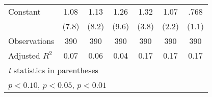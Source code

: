 \begin{table}[htbp]
\begin{tabular}{l*{6}{c}}
Constant        &     1.08\sym{***}&     1.13\sym{***}&     1.26\sym{***}&     1.32\sym{***}&     1.07\sym{**} &     .768         \\
                &    (7.8)         &    (8.2)         &    (9.6)         &    (3.8)         &    (2.2)         &    (1.1)         \\
\hline
Observations    &      390         &      390         &      390         &      390         &      390         &      390         \\
Adjusted \(R^{2}\)&     0.07         &     0.06         &     0.04         &     0.17         &     0.17         &     0.17         \\
\hline\hline
\multicolumn{7}{l}{\footnotesize \textit{t} statistics in parentheses}\\
\multicolumn{7}{l}{\footnotesize \sym{*} \(p<0.10\), \sym{**} \(p<0.05\), \sym{***} \(p<0.01\)}\\
\end{tabular}
\end{table}
